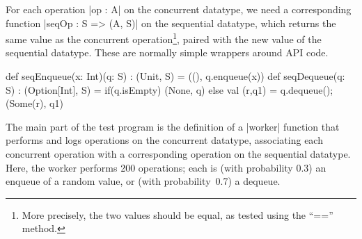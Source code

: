 
\begin{slide}

For each operation |op : A| on the concurrent datatype, we need a
corresponding function |seqOp : S => (A, S)| on the sequential datatype, which
returns the same value as the concurrent operation\footnote{More precisely,
  the two values should be equal, as tested using the ``{\scalashape ==}''
  method.}, paired with the new value of the sequential datatype.  These are
normally simple wrappers around API code.
%
\begin{scala}
  def seqEnqueue(x: Int)(q: S) : (Unit, S) = ((), q.enqueue(x))
  def seqDequeue(q: S) : (Option[Int], S) =   
    if(q.isEmpty) (None, q) 
    else{ val (r,q1) = q.dequeue(); (Some(r), q1) }
\end{scala}
\vfill
\end{slide}


\begin{slide}

The main part of the test program is the definition of a |worker| function
that performs and logs operations on the concurrent datatype, associating each
concurrent operation with a corresponding operation on the sequential
datatype.  Here, the worker performs 200 operations; each is (with probability
0.3) an enqueue of a random value, or (with probability~0.7) a dequeue.
\end{slide}



